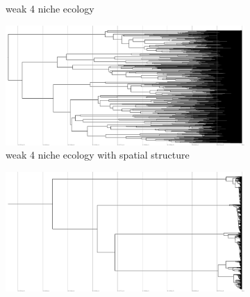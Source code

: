 \begin{figure}
\begin{subfigure}[b]{1\columnwidth}
    \caption{%
      weak 4 niche ecology}
  \end{subfigure}
  \hfill
  \begin{subfigure}[b]{1\columnwidth}
      \includegraphics[height=0.12\textheight,width=\textwidth]{img/perfect-tree-phylogenies-log/epoch=7+resolution=3+treatment=24/a=collapsed-phylogeny+epoch=00007+mut_distn=np.random.standard_normal+num_generations=32768+num_islands=1024+num_niches=4+p_island_migration=0.01+p_niche_invasion=3.0517578125e-06+population_size=3276.../8+replicate=0+tournament_size=2+treatment=24+_generation=262144+_index=24+scale=log+ext=.pdf}    %
    \caption{%
      weak 4 niche ecology with spatial structure }
  \end{subfigure}
  \hfill
  \begin{subfigure}[b]{1\columnwidth}
    \includegraphics[height=0.12\textheight,width=\textwidth]{img/perfect-tree-phylogenies-log/epoch=7+resolution=3+treatment=10/a=collapsed-phylogeny+epoch=00007+mut_distn=np.random.standard_normal+num_generations=32768+num_islands=1+num_niches=4+p_island_migration=0.01+p_niche_invasion=3.0517578125e-08+population_size=32768+r.../eplicate=0+tournament_size=2+treatment=10+_generation=262144+_index=10+scale=log+ext=.pdf}

\end{subfigure}
\end{figure}
